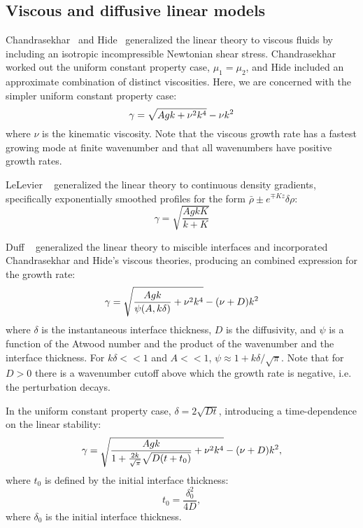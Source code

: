 \subsection{Viscous and diffusive linear models}
Chandrasekhar~\cite{Chandrasekhar1955} and Hide~\cite{Hide1955} generalized the linear theory to viscous fluids by including an isotropic incompressible Newtonian shear stress.
Chandrasekhar worked out the uniform constant property case, $\mu_1 = \mu_2$, and Hide included an approximate combination of distinct viscosities.
Here, we are concerned with the simpler uniform constant property case:
\begin{equation} \elabel{visc_growth}
  \gamma = \sqrt{A g k + \nu^2 k^4} - \nu k^2
\end{equation} 
where 
$\nu$ is the kinematic viscosity.
Note that the viscous growth rate has a fastest growing mode at finite wavenumber and that all wavenumbers have positive growth rates.

LeLevier \etal~\cite{LeLevier1955} generalized the linear theory to continuous density gradients, specifically exponentially smoothed profiles for the form $\bar\rho \pm e^{\mp K z} \delta\rho$:
\begin{equation}
\gamma = \sqrt{\frac{A g k K}{k + K}}
\end{equation}

Duff \etal~\cite{Duff1962} generalized the linear theory to miscible interfaces and incorporated Chandrasekhar and Hide's viscous theories, producing an combined expression for the growth rate:
\begin{equation} \elabel{duff_simple}
\gamma = \sqrt{\frac{A g k}{\psi(A,k\delta)} + \nu^2 k^4} - (\nu + D) k^2
\end{equation}
where 
$\delta$ is the instantaneous interface thickness,
$D$ is the diffusivity,
and $\psi$ is a function of the Atwood number and the product of the wavenumber and the interface thickness.
For $k \delta << 1$ and $A << 1$, $\psi \approx 1 + k \delta / \sqrt{\pi}$.
Note that for $D > 0$ there is a wavenumber cutoff above which the growth rate is negative, i.e. the perturbation decays.

In the uniform constant property case, $\delta = 2 \sqrt{D t}$, introducing a time-dependence on the linear stability:
\begin{equation} \elabel{duff_growth}
\gamma = \sqrt{\frac{A g k}{1 + \frac{2 k}{\sqrt{\pi}}\sqrt{D (t+t_0)} } + \nu^2 k^4} - (\nu + D) k^2,
\end{equation}
where $t_0$ is defined by the initial interface thickness:
\begin{equation}
t_0 = \frac{\delta_0^2}{4 D},
\end{equation}
where $\delta_0$ is the initial interface thickness.

